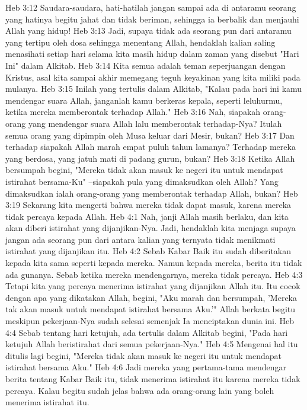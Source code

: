 Heb 3:12  Saudara-saudara, hati-hatilah jangan sampai ada di antaramu seorang yang hatinya begitu jahat dan tidak beriman, sehingga ia berbalik dan menjauhi Allah yang hidup!
Heb 3:13  Jadi, supaya tidak ada seorang pun dari antaramu yang tertipu oleh dosa sehingga menentang Allah, hendaklah kalian saling menasihati setiap hari selama kita masih hidup dalam zaman yang disebut "Hari Ini" dalam Alkitab.
Heb 3:14  Kita semua adalah teman seperjuangan dengan Kristus, asal kita sampai akhir memegang teguh keyakinan yang kita miliki pada mulanya.
Heb 3:15  Inilah yang tertulis dalam Alkitab, "Kalau pada hari ini kamu mendengar suara Allah, janganlah kamu berkeras kepala, seperti leluhurmu, ketika mereka memberontak terhadap Allah."
Heb 3:16  Nah, siapakah orang-orang yang mendengar suara Allah lalu memberontak terhadap-Nya? Itulah semua orang yang dipimpin oleh Musa keluar dari Mesir, bukan?
Heb 3:17  Dan terhadap siapakah Allah marah empat puluh tahun lamanya? Terhadap mereka yang berdosa, yang jatuh mati di padang gurun, bukan?
Heb 3:18  Ketika Allah bersumpah begini, "Mereka tidak akan masuk ke negeri itu untuk mendapat istirahat bersama-Ku" --siapakah pula yang dimaksudkan oleh Allah? Yang dimaksudkan ialah orang-orang yang memberontak terhadap Allah, bukan?
Heb 3:19  Sekarang kita mengerti bahwa mereka tidak dapat masuk, karena mereka tidak percaya kepada Allah.
Heb 4:1  Nah, janji Allah masih berlaku, dan kita akan diberi istirahat yang dijanjikan-Nya. Jadi, hendaklah kita menjaga supaya jangan ada seorang pun dari antara kalian yang ternyata tidak menikmati istirahat yang dijanjikan itu.
Heb 4:2  Sebab Kabar Baik itu sudah diberitakan kepada kita sama seperti kepada mereka. Namun kepada mereka, berita itu tidak ada gunanya. Sebab ketika mereka mendengarnya, mereka tidak percaya.
Heb 4:3  Tetapi kita yang percaya menerima istirahat yang dijanjikan Allah itu. Itu cocok dengan apa yang dikatakan Allah, begini, "Aku marah dan bersumpah, 'Mereka tak akan masuk untuk mendapat istirahat bersama Aku.'" Allah berkata begitu meskipun pekerjaan-Nya sudah selesai semenjak Ia menciptakan dunia ini.
Heb 4:4  Sebab tentang hari ketujuh, ada tertulis dalam Alkitab begini, "Pada hari ketujuh Allah beristirahat dari semua pekerjaan-Nya."
Heb 4:5  Mengenai hal itu ditulis lagi begini, "Mereka tidak akan masuk ke negeri itu untuk mendapat istirahat bersama Aku."
Heb 4:6  Jadi mereka yang pertama-tama mendengar berita tentang Kabar Baik itu, tidak menerima istirahat itu karena mereka tidak percaya. Kalau begitu sudah jelas bahwa ada orang-orang lain yang boleh menerima istirahat itu.
